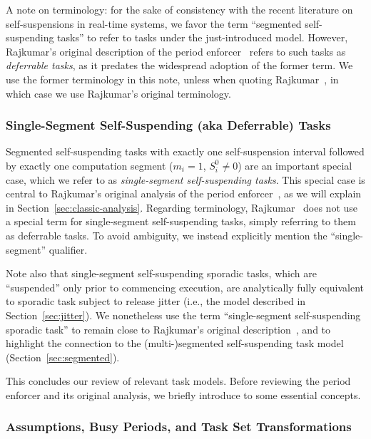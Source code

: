 A note on terminology: for the sake of consistency with the recent literature on self-suspensions in real-time systems, we favor the term ``segmented self-suspending tasks'' to refer to tasks under the just-introduced model. However,  Rajkumar's original description of the period enforcer~\cite{Raj:suspension1991} refers to such tasks as  \emph{deferrable tasks}, as it predates the widespread adoption of the former term. We use the former terminology in this note, unless when quoting Rajkumar~\cite{Raj:suspension1991}, in which case we use Rajkumar's original terminology.


\subsubsection{Single-Segment Self-Suspending (aka Deferrable) Tasks}
\label{sec:single-segmented}

Segmented self-suspending tasks with exactly one self-suspension interval followed by exactly one computation segment ($m_i = 1$, $S_i^0 \neq 0$) are an important special case, which we refer to as \emph{single-segment self-suspending tasks}.  This special case is central to Rajkumar's original analysis of the period enforcer~\cite{Raj:suspension1991},  as we will explain in Section~\ref{sec:classic-analysis}.
Regarding terminology, Rajkumar~\cite{Raj:suspension1991} does not use a special term for single-segment self-suspending tasks, simply referring to them as deferrable tasks. To avoid ambiguity, we instead explicitly mention the ``single-segment'' qualifier.  

Note also that single-segment self-suspending sporadic tasks, which are  ``suspended'' only prior to commencing execution, are analytically fully equivalent to sporadic task subject to release jitter (i.e., the model described in Section~\ref{sec:jitter}). We nonetheless use the term ``single-segment self-suspending sporadic task'' to remain close to Rajkumar's original description~\cite{Raj:suspension1991}, and to highlight the connection to the (multi-)segmented self-suspending task model (Section~\ref{sec:segmented}).

This concludes our review of relevant task models. Before reviewing the period enforcer and its original analysis, we briefly introduce to some essential concepts.

\subsubsection{Assumptions, Busy Periods, and Task Set Transformations}
\label{sec:misc-defs}

